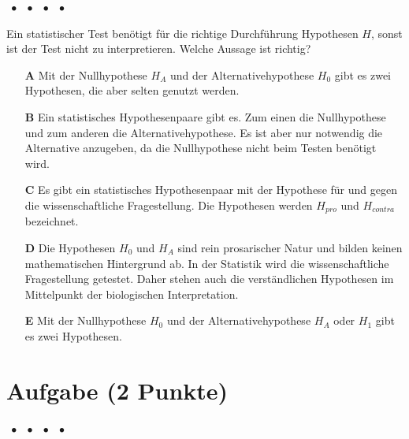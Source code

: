\documentclass[a4paper, 9pt]{scrartcl}\usepackage[]{graphicx}\usepackage[]{xcolor}
\begin{document}
\ifcollection
\begin{flushright}
\tiny\vspace{-2Ex}
\textbf{\examinhaltstart}
\exammodulemathstat $\;\bullet$
\exammodulestat $\;\bullet$
\exammodulestatbbv $\;\bullet$
\exammodulestatversuch $\;\bullet$
\exammodulebiostat
\vspace{-1Ex}
\end{flushright}
\fi




Ein statistischer Test benötigt für die richtige Durchführung Hypothesen $H$, sonst ist der Test nicht zu interpretieren. Welche Aussage ist richtig?



\begin{enumerate}
\item [\textbf{A} \msquare] Mit der Nullhypothese $H_A$ und der Alternativehypothese $H_0$ gibt es zwei Hypothesen, die aber selten genutzt werden.
\item [\textbf{B} \msquare] Ein statistisches Hypothesenpaare gibt es. Zum einen die Nullhypothese und zum anderen die Alternativehypothese. Es ist aber nur notwendig die Alternative anzugeben, da die Nullhypothese nicht beim Testen benötigt wird.
\item [\textbf{C} \msquare] Es gibt ein statistisches Hypothesenpaar mit der Hypothese für und gegen die wissenschaftliche Fragestellung. Die Hypothesen werden $H_{pro}$ und $H_{contra}$ bezeichnet.
\item [\textbf{D} \msquare] Die Hypothesen $H_0$ und $H_A$ sind rein prosarischer Natur und bilden keinen mathematischen Hintergrund ab. In der Statistik wird die wissenschaftliche Fragestellung getestet. Daher stehen auch die verständlichen Hypothesen im Mittelpunkt der biologischen Interpretation.
\item [\textbf{E} \msquare] Mit der Nullhypothese $H_0$ und der Alternativehypothese $H_A$ oder $H_1$ gibt es zwei Hypothesen.
\end{enumerate}

\section{Aufgabe \hfill (2 Punkte)}

\ifcollection
\begin{flushright}
\tiny\vspace{-2Ex}
\textbf{\examinhaltstart}
\exammodulemathstat $\;\bullet$
\exammodulestat $\;\bullet$
\exammodulestatbbv $\;\bullet$
\exammodulestatversuch $\;\bullet$
\exammodulebiostat
\vspace{-1Ex}
\end{flushright}
\fi
\end{document}
